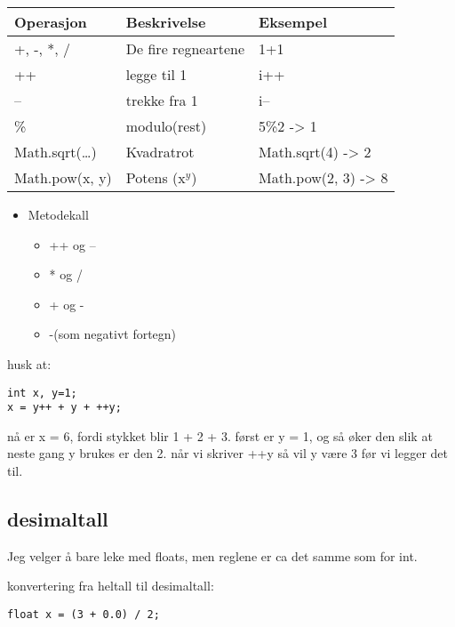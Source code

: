 \documentclass[11pt]{article}
\begin{document}
\begin{center}
\begin{tabular}{lll}
\hline
 Operasjon            &  Beskrivelse          &  Eksempel             \\
\hline
 +, -, *, /           &  De fire regneartene  &  1+1                  \\
\hline
 ++                   &  legge til 1          &  i++                  \\
\hline
 --                   &  trekke fra 1         &  i--                  \\
\hline
 \%                   &  modulo(rest)         &  5\%2 -> 1            \\
\hline
 Math.sqrt(\ldots{})  &  Kvadratrot           &  Math.sqrt(4) -> 2    \\
\hline
 Math.pow(x, y)       &  Potens (x$^y$)       &  Math.pow(2, 3) -> 8  \\
\hline
\end{tabular}
\end{center}


  
   
\begin{itemize}
\item Metodekall

\begin{itemize}
\item ++ og --
\item * og /
\item + og -
\item -(som negativt fortegn)
\end{itemize}

\end{itemize}


   husk at:
\begin{verbatim}
int x, y=1;
x = y++ + y + ++y;
\end{verbatim}
   nå er x = 6, fordi stykket blir 1 + 2 + 3. først er y = 1, og 
   så øker den slik at neste gang y brukes er den 2. 
   når vi skriver ++y så vil y være 3 før vi legger det til.
\subsection{desimaltall}
\label{sec-1_2}


   Jeg velger å bare leke med floats, men reglene er ca det samme som for int.

   konvertering fra heltall til desimaltall:
\begin{verbatim}
float x = (3 + 0.0) / 2;
\end{verbatim}
\end{document}

